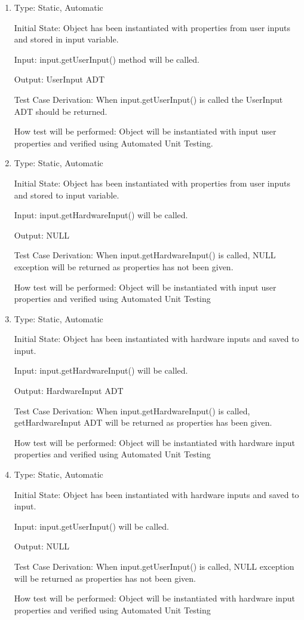 \documentclass[12pt, titlepage]{article}
\begin{document}
\begin{enumerate}[{UT-IC}1.]

\item

Type: Static, Automatic
					
Initial State: Object has been instantiated with properties from user inputs and stored in input variable.
					
Input: input.getUserInput() method will be called.
					
Output: UserInput ADT

Test Case Derivation: When input.getUserInput() is called the UserInput ADT should be returned.

How test will be performed: Object will be instantiated with input user properties and verified using Automated Unit Testing.
					
\item

Type: Static, Automatic
					
Initial State: Object has been instantiated with properties from user inputs and stored to input variable.
					
Input: input.getHardwareInput() will be called.
					
Output: NULL

Test Case Derivation: When input.getHardwareInput() is called, NULL exception will be returned as properties has not been given.


How test will be performed: Object will be instantiated with input user properties and verified using Automated Unit Testing

\item

Type: Static, Automatic
					
Initial State: Object has been instantiated with hardware inputs and saved to input.
					
Input: input.getHardwareInput() will be called.
					
Output: HardwareInput ADT

Test Case Derivation: When input.getHardwareInput() is called, getHardwareInput ADT will be returned as properties has been given.


How test will be performed: Object will be instantiated with hardware input properties and verified using Automated Unit Testing 

\item

Type: Static, Automatic
					
Initial State: Object has been instantiated with hardware inputs and saved to input.
					
Input: input.getUserInput() will be called.
					
Output: NULL

Test Case Derivation: When input.getUserInput() is called, NULL exception will be returned as properties has not been given.


How test will be performed: Object will be instantiated with hardware input properties and verified using Automated Unit Testing

    
\end{enumerate}
\end{document}
